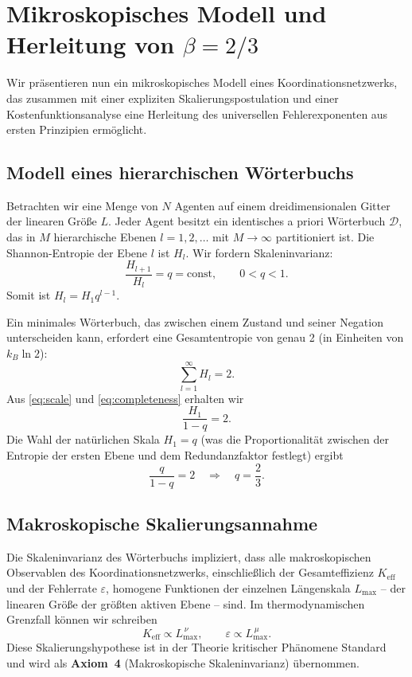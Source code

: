 \documentclass[11pt,a4paper]{article}
\newcommand{\Dir}{\mathcal{D}}
\begin{document}
	\section{Mikroskopisches Modell und Herleitung von \(\beta = 2/3\)}
	\label{sec:micro}
	
	Wir präsentieren nun ein mikroskopisches Modell eines Koordinationsnetzwerks, das zusammen mit einer expliziten Skalierungspostulation und einer Kostenfunktionsanalyse eine Herleitung des universellen Fehlerexponenten aus ersten Prinzipien ermöglicht.
	
	\subsection{Modell eines hierarchischen Wörterbuchs}
	Betrachten wir eine Menge von \(N\) Agenten auf einem dreidimensionalen Gitter der linearen Größe \(L\). Jeder Agent besitzt ein identisches a priori Wörterbuch \(\Dir\), das in \(M\) hierarchische Ebenen \(l = 1,2,\dots\) mit \(M \to \infty\) partitioniert ist. Die Shannon-Entropie der Ebene \(l\) ist \(H_l\). Wir fordern Skaleninvarianz:
	\begin{equation}
		\frac{H_{l+1}}{H_l} = q = \text{const}, \qquad 0 < q < 1. \label{eq:scale}
	\end{equation}
	Somit ist \(H_l = H_1 q^{l-1}\).
	
	Ein minimales Wörterbuch, das zwischen einem Zustand und seiner Negation unterscheiden kann, erfordert eine Gesamtentropie von genau 2 (in Einheiten von \(k_B \ln 2\)):
	\begin{equation}
		\sum_{l=1}^{\infty} H_l = 2. \label{eq:completeness}
	\end{equation}
	Aus \eqref{eq:scale} und \eqref{eq:completeness} erhalten wir
	\[
	\frac{H_1}{1-q} = 2.
	\]
	Die Wahl der natürlichen Skala \(H_1 = q\) (was die Proportionalität zwischen der Entropie der ersten Ebene und dem Redundanzfaktor festlegt) ergibt
	\[
	\frac{q}{1-q} = 2 \quad\Longrightarrow\quad q = \frac{2}{3}. \label{eq:qval}
	\]
	
	\subsection{Makroskopische Skalierungsannahme}
	Die Skaleninvarianz des Wörterbuchs impliziert, dass alle makroskopischen Observablen des Koordinationsnetzwerks, einschließlich der Gesamteffizienz \(K_{\mathrm{eff}}\) und der Fehlerrate \(\varepsilon\), homogene Funktionen der einzelnen Längenskala \(L_{\max}\) – der linearen Größe der größten aktiven Ebene – sind. Im thermodynamischen Grenzfall können wir schreiben
	\begin{equation}
		K_{\mathrm{eff}} \propto L_{\max}^{\,\nu}, \qquad \varepsilon \propto L_{\max}^{\,\mu}. \label{eq:scaling-assume}
	\end{equation}
	Diese Skalierungshypothese ist in der Theorie kritischer Phänomene Standard und wird als \textbf{Axiom~4} (Makroskopische Skaleninvarianz) übernommen.
	
\end{document}
